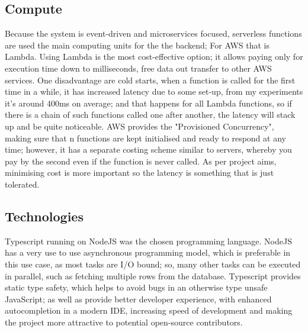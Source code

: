 \subsection{Compute}
Because the system is event-driven and microservices focused, serverless functions are used the main computing units for the the backend; For AWS that is Lambda. Using Lambda is the most cost-effective option; it allows paying only for execution time down to milliseconds, free data out transfer to other AWS services. One disadvantage are cold starts, when a function is called for the first time in a while, it has increased latency due to some set-up, from my experiments it's around 400ms on average; and that happens for all Lambda functions, so if there is a chain of such functions called one after another, the latency will stack up and be quite noticeable. AWS provides the "Provisioned Concurrency", making sure that n functions are kept initialised and ready to respond at any time; however, it has a separate costing scheme similar to servers, whereby you pay by the second even if the function is never called. As per project aims, minimising cost is more important so the latency is something that is just tolerated.
\subsection{Technologies}
Typescript running on NodeJS was the chosen programming language. NodeJS has a very use to use asynchronous programming model, which is preferable in this use case, as most tasks are I/O bound; so, many other tasks can be executed in parallel, such as fetching multiple rows from the database. Typescript provides static type safety, which helps to avoid bugs in an otherwise type unsafe JavaScript; as well as provide better developer experience, with enhanced autocompletion in a modern IDE, increasing speed of development and making the project more attractive to potential open-source contributors.
